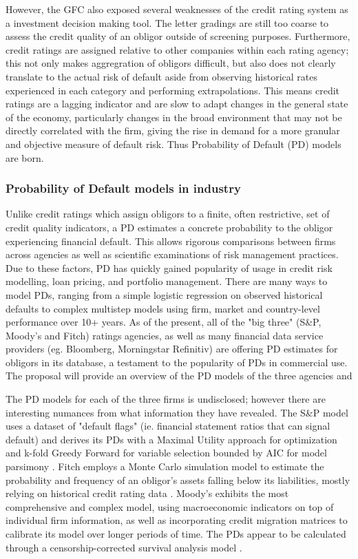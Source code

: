 \documentclass[10pt]{article}
\begin{document}
\begin{multicols*}{2}
However, the GFC also exposed several weaknesses of the credit rating system as a investment decision making tool. The letter gradings are still too coarse to assess the credit quality of an obligor outside of screening purposes.
Furthermore, credit ratings are assigned relative to other companies within each rating agency; this not only makes aggregration of obligors difficult, but also does not clearly translate to the actual risk of default aside from observing historical rates experienced in each category and performing extrapolations.
This means credit ratings are a lagging indicator and are slow to adapt changes in the general state of the economy, particularly changes in the broad environment that may not be directly correlated with the firm, giving the rise in demand for a more granular and objective measure of default risk.
Thus Probability of Default (PD) models are born.
    
\subsubsection{Probability of Default models in industry}\label{industry}

Unlike credit ratings which assign obligors to a finite, often restrictive, set of credit quality indicators, a PD estimates a concrete probability to the obligor experiencing financial default.
This allows rigorous comparisons between firms across agencies as well as scientific examinations of risk management practices. Due to these factors, PD has quickly gained popularity of usage in credit risk modelling, loan pricing, and portfolio management.
There are many ways to model PDs, ranging from a simple logistic regression on observed historical defaults to complex multistep models using firm, market and country-level performance over 10+ years. 
As of the present, all of the "big three" (S\&P, Moody's and Fitch) ratings agencies, as well as many financial data service providers (eg. Bloomberg, Morningstar Refinitiv) are offering PD estimates for obligors in its database, a testament to the popularity of PDs in commercial use.
The proposal will provide an overview of the PD models of the three agencies and 

The PD models for each of the three firms is undisclosed; however there are interesting numances from what information they have revealed. 
The S\&P model uses a dataset of "default flags" (ie. financial statement ratios that can signal default) and derives its PDs with a Maximal Utility approach for optimization and k-fold Greedy Forward for variable selection bounded by AIC for model parsimony \citep{SP-PD-methodology}. 
Fitch employs a Monte Carlo simulation model to estimate the probability and frequency of an obligor's assets falling below its liabilities, mostly relying on historical credit rating data \citep{Fitch-PD-methodology}. 
Moody's exhibits the most comprehensive and complex model, using macroeconomic indicators on top of individual firm information, as well as incorporating credit migration matrices to calibrate its model over longer periods of time. The PDs appear to be calculated through a censorship-corrected survival analysis model \citep{Moodys-PD-methodology}.


\end{multicols*}
\end{document}
